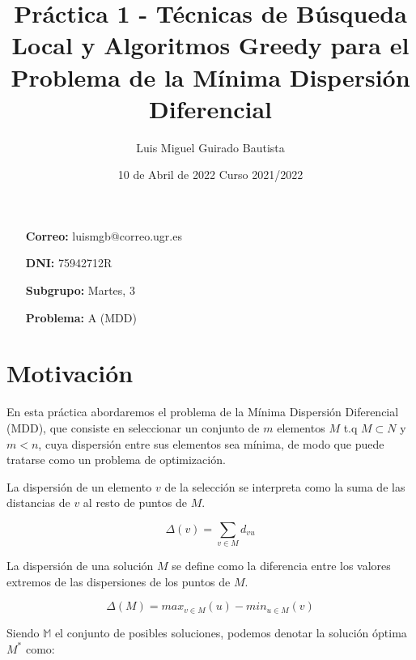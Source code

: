 \documentclass{article}
\title{Práctica 1 - Técnicas de Búsqueda Local y Algoritmos Greedy para el Problema de la Mínima Dispersión Diferencial}
\author{Luis Miguel Guirado Bautista}
\date{10 de Abril de 2022 \qquad Curso 2021/2022}
\begin{document}
    \begin{titlepage}
        \maketitle
        \thispagestyle{empty}
        \begin{enumerate}
            \item[\textbf{Correo:}]luismgb@correo.ugr.es
            \item[\textbf{DNI:}]75942712R
            \item[\textbf{Subgrupo:}]Martes, 3
            \item[\textbf{Problema:}]A (MDD) 
        \end{enumerate}
    \end{titlepage}

    \pagebreak

    \tableofcontents

    \pagebreak
    \rfoot{\thepage}
    \section{Motivación}

    En esta práctica abordaremos el problema de la Mínima Dispersión Diferencial (MDD), que consiste en
    seleccionar un conjunto de $m$ elementos $M$ t.q $M \subset N$ y $m < n$, cuya dispersión entre sus
    elementos sea mínima, de modo que puede tratarse como un problema de optimización.

    \vspace*{0.1in}
    La dispersión de un elemento $v$ de la selección se interpreta como la suma de las distancias de
    $v$ al resto de puntos de $M$.

    \begin{equation*}
        \Delta(v) = \sum_{v \in M}d_{vu}
    \end{equation*}

    La dispersión de una solución $M$ se define como la diferencia entre los valores extremos de las
    dispersiones de los puntos de $M$.

    \begin{equation*}
        \Delta(M) = max_{v \in M}(u) - min_{u \in M}(v)
    \end{equation*}

    Siendo $\mathbb{M}$ el conjunto de posibles soluciones, podemos denotar la solución óptima $M^*$ como:
\end{document}
